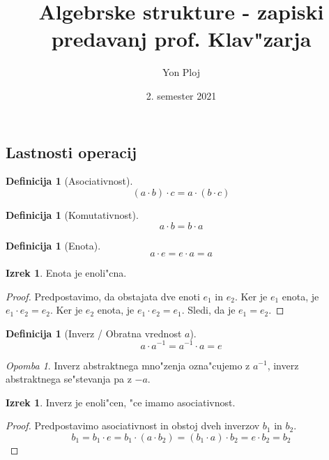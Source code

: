 \documentclass[11pt, a4paper]{article}
\theoremstyle{definition}
\newtheorem{defn}[counter]{Definicija}
\newtheorem{theorem}[counter]{Izrek}
\theoremstyle{remark}
\newtheorem*{rem}{Opomba}
\begin{document}
	
	\title{Algebrske strukture - zapiski predavanj prof. Klav"zarja}
	\author{Yon Ploj}
	\date{2. semester 2021}
	\maketitle
	
	\tableofcontents
	\vspace{2cm}

	\subsection{Lastnosti operacij}
	\begin{defn}[Asociativnost]
		\[ (a \cdot b) \cdot c = a \cdot (b \cdot c) \]
	\end{defn}
	\begin{defn}[Komutativnost]
		\[ a \cdot b = b \cdot a \]
	\end{defn}
	\begin{defn}[Enota]
		\[ a \cdot e = e \cdot a = a \]
	\end{defn}
	\begin{theorem}
		Enota je enoli"cna.
	\end{theorem}
	\begin{proof}
		Predpostavimo, da obstajata dve enoti $e_1$ in $e_2$.
		Ker je $e_1$ enota, je $e_1 \cdot e_2 = e_2$.
		Ker je $e_2$ enota, je $e_1 \cdot e_2 = e_1$.
		Sledi, da je $e_1 = e_2$.
	\end{proof}

	\begin{defn}[Inverz / Obratna vrednost $a$]
		\[ a \cdot a^{-1} = a^{-1} \cdot a = e \]
	\end{defn}
	\begin{rem}
		Inverz abstraktnega mno"zenja ozna"cujemo z $a^{-1}$, inverz abstraktnega se"stevanja pa z $-a$.
	\end{rem}
	\begin{theorem}
		Inverz je enoli"cen, "ce imamo asociativnost.
	\end{theorem}
	\begin{proof}
		Predpostavimo asociativnost in obstoj dveh inverzov $b_1$ in $b_2$.
		\[ b_1 = b_1 \cdot e = b_1 \cdot (a \cdot b_2) = (b_1 \cdot a) \cdot b_2 = e \cdot b_2 = b_2 \]
	\end{proof}
\end{document}

